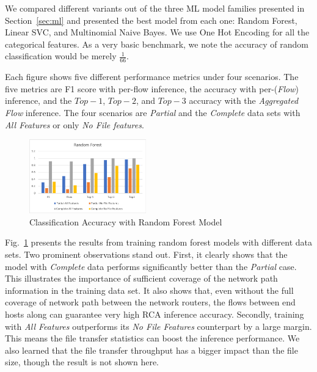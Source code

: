 We compared different variants out of the three ML model families presented in Section~\ref{sec:ml} and presented the best model from each one: Random Forest, Linear SVC, and Multinomial Naive Bayes.
We use One Hot Encoding for all the categorical features. As a very basic benchmark, we note the accuracy of random classification would be merely $\frac{1}{66}$. 

Each figure shows five different performance metrics under four scenarios. The five metrics are F1 score with per-flow inference, the accuracy with per-({\it Flow}) inference, and the $Top-1$, $Top-2$, and $Top-3$ accuracy with
the {\it Aggregated Flow} inference. The four scenarios are {\it Partial} and the {\it Complete} data sets with {\it All Features} or only {\it No File features}.

\begin{figure}[!ht]
\begin{center}
\includegraphics[width=0.45\textwidth]{./figure/rf-accuracy}
\end{center}
\caption{Classification Accuracy with Random Forest Model}
\label{fig:dt}
\end{figure}

Fig.~\ref{fig:dt} presents the results from training random forest models with different data sets. Two prominent observations stand out. 
First, it clearly shows that the model with {\it Complete} data performs significantly better than the {\it Partial} case. This illustrates the importance of sufficient 
coverage of the network path information in the training data set. It also shows that, even without the full coverage of network path between the network routers, 
the flows between end hosts along can guarantee very high RCA inference accuracy.   
Secondly, training with {\it All Features} outperforms its {\it No File Features} counterpart by a large margin. This means the file transfer statistics can boost the inference performance.  
We also learned that the file transfer throughput has a bigger impact than the file size, though the result is not shown here. 

